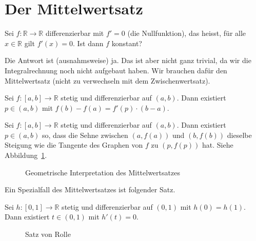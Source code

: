 \documentclass[../main.tex]{subfiles}
\begin{document}
\section{Der Mittelwertsatz}
\begin{question}
  Sei $f \colon \mathbb{R} \to \mathbb{R}$ 
  differenzierbar mit $f' = 0$ (die Nullfunktion),
  das heisst, für alle $x \in \mathbb{R}$ gilt
  $f'(x) = 0$. Ist dann $f$ konstant?
\end{question}

Die Antwort ist (ausnahmsweise) ja.
Das ist aber nicht ganz trivial, da wir
die Integralrechnung noch nicht aufgebaut haben.
Wir brauchen dafür den Mittelwertsatz
(nicht zu verwechseln mit dem Zwischenwertsatz).

\begin{meanvalue}
  Sei $f \colon [a, b] \to \mathbb{R}$ 
  stetig und differenzierbar auf $(a, b)$.
  Dann existiert $p \in (a, b)$ mit $f(b) - f(a)
  = f'(p) \cdot (b-a)$.
\end{meanvalue}

\begin{geometric}
  Sei $ f \colon [a, b] \to \mathbb{R}$ stetig
  und differenzierbar auf $(a, b)$.
  Dann existiert $p \in (a, b)$ so, dass
  die Sehne zwischen $(a, f(a))$ und
  $(b, f(b))$ dieselbe Steigung
  wie die Tangente des Graphen von $f$ zu $
  (p, f(p))$ hat. Siehe Abbildung~\ref{fig:meanvalue}.
\end{geometric}

\begin{figure}[htb]
  \centering
  
  \caption{Geometrische Interpretation
  des Mittelwertsatzes}%
  \label{fig:meanvalue}
\end{figure}

Ein Spezialfall des Mittelwertsatzes ist folgender Satz.

\begin{rolle}
  Sei $h \colon [0, 1] \to \mathbb{R}$ stetig
  und differenzierbar auf $(0, 1)$ 
  mit $h(0) = h(1)$.
  Dann existiert $t \in (0, 1)$ 
  mit $h'(t) = 0$.
\end{rolle}

\begin{figure}[htb]
  \centering
  
  \caption{Satz von Rolle}%
  \label{fig:rolle}
\end{figure}
\end{document}
